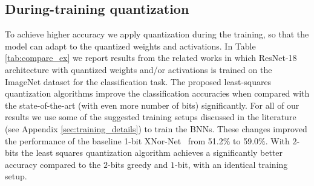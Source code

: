 \documentclass[10pt,twocolumn,letterpaper]{article}
\begin{document}
\subsection{During-training quantization}
To achieve higher accuracy we apply quantization during the training, so that the model can adapt to the quantized weights and activations. In Table \ref{tab:compare_ex} we report results from the related works in which ResNet-18 architecture with quantized weights and/or activations is trained on the ImageNet dataset for the classification task.
The proposed least-squares quantization algorithms improve the classification accuracies when compared with the state-of-the-art (with even more number of bits) significantly.
For all of our results we use some of the suggested training setups discussed in the literature (see Appendix \ref{sec:training_details}) to train the BNNs. These changes improved the performance of the baseline 1-bit XNor-Net~\cite{rastegari2016xnor} from 51.2$\%$ to 59.0$\%$. With $2$-bits the least squares quantization algorithm achieves a significantly better accuracy compared to the $2$-bits greedy and $1$-bit, with an identical training setup.
\end{document}
